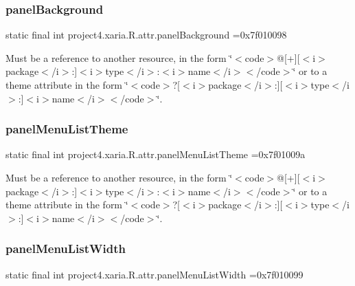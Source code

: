 \subsubsection{\texorpdfstring{panel\+Background}{panelBackground}}
{\footnotesize\ttfamily static final int project4.\+xaria.\+R.\+attr.\+panel\+Background =0x7f010098\hspace{0.3cm}{\ttfamily [static]}}

Must be a reference to another resource, in the form \char`\"{}$<$code$>$@\mbox{[}+\mbox{]}\mbox{[}$<$i$>$package$<$/i$>$\+:\mbox{]}$<$i$>$type$<$/i$>$\+:$<$i$>$name$<$/i$>$$<$/code$>$\char`\"{} or to a theme attribute in the form \char`\"{}$<$code$>$?\mbox{[}$<$i$>$package$<$/i$>$\+:\mbox{]}\mbox{[}$<$i$>$type$<$/i$>$\+:\mbox{]}$<$i$>$name$<$/i$>$$<$/code$>$\char`\"{}. \mbox{\label{classproject4_1_1xaria_1_1R_1_1attr_a8c926f3ce59f968aaa39ef0665562f9e}} 
\subsubsection{\texorpdfstring{panel\+Menu\+List\+Theme}{panelMenuListTheme}}
{\footnotesize\ttfamily static final int project4.\+xaria.\+R.\+attr.\+panel\+Menu\+List\+Theme =0x7f01009a\hspace{0.3cm}{\ttfamily [static]}}

Must be a reference to another resource, in the form \char`\"{}$<$code$>$@\mbox{[}+\mbox{]}\mbox{[}$<$i$>$package$<$/i$>$\+:\mbox{]}$<$i$>$type$<$/i$>$\+:$<$i$>$name$<$/i$>$$<$/code$>$\char`\"{} or to a theme attribute in the form \char`\"{}$<$code$>$?\mbox{[}$<$i$>$package$<$/i$>$\+:\mbox{]}\mbox{[}$<$i$>$type$<$/i$>$\+:\mbox{]}$<$i$>$name$<$/i$>$$<$/code$>$\char`\"{}. \mbox{\label{classproject4_1_1xaria_1_1R_1_1attr_acbeba7aa62e7528b101a89409abe2992}} 
\subsubsection{\texorpdfstring{panel\+Menu\+List\+Width}{panelMenuListWidth}}
{\footnotesize\ttfamily static final int project4.\+xaria.\+R.\+attr.\+panel\+Menu\+List\+Width =0x7f010099\hspace{0.3cm}{\ttfamily [static]}}


